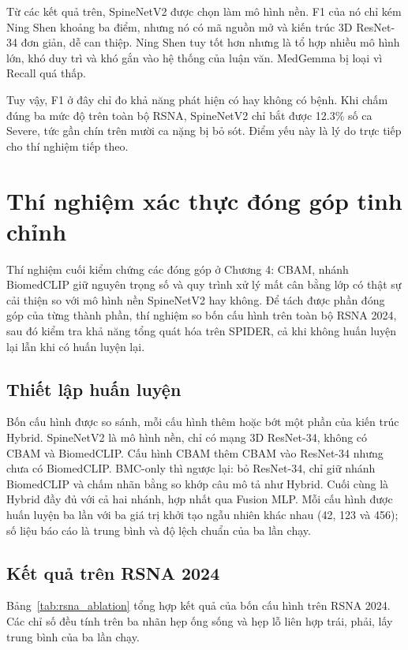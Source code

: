 Từ các kết quả trên, SpineNetV2 được chọn làm mô hình nền. F1 của nó chỉ kém Ning Shen khoảng ba điểm, nhưng nó có mã nguồn mở và kiến trúc 3D ResNet-34 đơn giản, dễ can thiệp. Ning Shen tuy tốt hơn nhưng là tổ hợp nhiều mô hình lớn, khó duy trì và khó gắn vào hệ thống của luận văn. MedGemma bị loại vì Recall quá thấp.

Tuy vậy, F1 ở đây chỉ đo khả năng phát hiện có hay không có bệnh. Khi chấm đúng ba mức độ trên toàn bộ RSNA, SpineNetV2 chỉ bắt được 12.3\% số ca Severe, tức gần chín trên mười ca nặng bị bỏ sót. Điểm yếu này là lý do trực tiếp cho thí nghiệm tiếp theo.

\section[Thí nghiệm xác thực đóng góp tinh chỉnh]{Thí nghiệm xác thực đóng góp tinh chỉnh}
\label{sec:phase2_eval}

Thí nghiệm cuối kiểm chứng các đóng góp ở Chương 4: CBAM, nhánh BiomedCLIP giữ nguyên trọng số và quy trình xử lý mất cân bằng lớp có thật sự cải thiện so với mô hình nền SpineNetV2 hay không. Để tách được phần đóng góp của từng thành phần, thí nghiệm so bốn cấu hình trên toàn bộ RSNA 2024, sau đó kiểm tra khả năng tổng quát hóa trên SPIDER, cả khi không huấn luyện lại lẫn khi có huấn luyện lại.


\subsection{Thiết lập huấn luyện}


Bốn cấu hình được so sánh, mỗi cấu hình thêm hoặc bớt một phần của kiến trúc Hybrid. SpineNetV2 là mô hình nền, chỉ có mạng 3D ResNet-34, không có CBAM và BiomedCLIP. Cấu hình CBAM thêm CBAM vào ResNet-34 nhưng chưa có BiomedCLIP. BMC-only thì ngược lại: bỏ ResNet-34, chỉ giữ nhánh BiomedCLIP và chấm nhãn bằng so khớp câu mô tả như Hybrid. Cuối cùng là Hybrid đầy đủ với cả hai nhánh, hợp nhất qua Fusion MLP. Mỗi cấu hình được huấn luyện ba lần với ba giá trị khởi tạo ngẫu nhiên khác nhau (42, 123 và 456); số liệu báo cáo là trung bình và độ lệch chuẩn của ba lần chạy.

\subsection{Kết quả trên RSNA 2024}
\label{subsec:rsna_ablation}

Bảng~\ref{tab:rsna_ablation} tổng hợp kết quả của bốn cấu hình trên RSNA 2024. Các chỉ số đều tính trên ba nhãn hẹp ống sống và hẹp lỗ liên hợp trái, phải, lấy trung bình của ba lần chạy.

